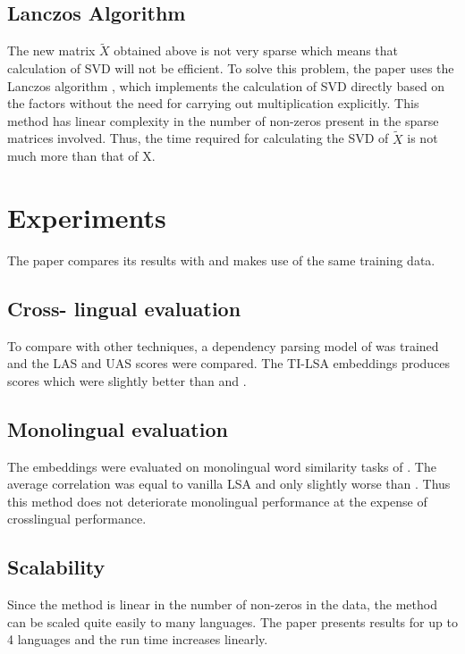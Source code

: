 \documentclass[11pt]{article}
\begin{document}
\subsection{Lanczos Algorithm}
The new matrix $\widetilde{X}$ obtained above is not very sparse which means that calculation of SVD will not be efficient. To solve this problem, the paper uses the Lanczos algorithm \cite{van1996matrix}, which implements the calculation of SVD directly based on the factors without the need for carrying out multiplication explicitly. This method has linear complexity in the number of non-zeros present in the sparse matrices involved.
Thus, the time required for calculating the SVD of $\widetilde{X}$ is not much more than that of X.

\section{Experiments}
The paper compares its results with \cite{faruqui2014improving} and makes use of the same training data.
\subsection{Cross- lingual evaluation}
To compare with other techniques, a dependency parsing model of \cite{guo2015cross} was trained and the LAS and UAS scores were compared. The TI-LSA embeddings produces scores which were slightly better than \cite{faruqui2014improving} and \cite{guo2015cross}.

\subsection{Monolingual evaluation}
The embeddings were evaluated on monolingual word similarity tasks of \cite{faruqui2014community}. The average correlation was equal to vanilla LSA and only slightly worse than \cite{faruqui2014improving}. Thus this method does not deteriorate monolingual performance at the expense of crosslingual performance.

\subsection{Scalability}
Since the method is linear in the number of non-zeros in the data, the method can be scaled quite easily to many languages. The paper presents results for up to 4 languages and the run time increases linearly.

\end{document}
